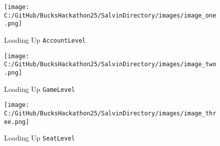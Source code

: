 \documentclass[a4paper]{article}
\begin{document}
\begin{figure}[h!]
    \centering
    \texttt{[image: C:/GitHub/BucksHackathon25/SalvinDirectory/images/image\_one.png]}
    \caption{Loading Up \texttt{AccountLevel}}
\end{figure}

\begin{figure}[h!]
    \centering
    \texttt{[image: C:/GitHub/BucksHackathon25/SalvinDirectory/images/image\_two.png]}
    \caption{Loading Up \texttt{GameLevel}}
\end{figure}

\begin{figure}[h!]
    \centering
    \texttt{[image: C:/GitHub/BucksHackathon25/SalvinDirectory/images/image\_three.png]}
    \caption{Loading Up \texttt{SeatLevel}}
\end{figure}
    
\end{document}
